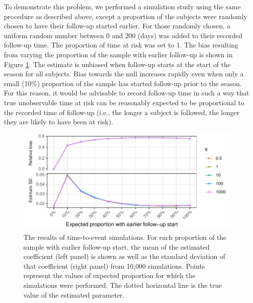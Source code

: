 
To demonstrate this problem, we performed a simulation study using the same procedure as described above, except a proportion of the subjects were randomly chosen to have their follow-up started earlier. For those randomly chosen, a uniform random number between 0 and 200 (days) was added to their recorded follow-up time. The proportion of time at risk was set to 1. The bias resulting from varying the proportion of the sample with earlier follow-up is shown in Figure \ref{CoxSimLong}. The estimate is unbiased when follow-up starts at the start of the season for all subjects. Bias towards the null increases rapidly even when only a small (10\%) proportion of the sample has started follow-up prior to the season. For this reason, it would be advisable to record follow-up time in such a way that true unobservable time at risk can be reasonably expected to be proportional to the recorded time of follow-up (i.e., the longer a subject is followed, the longer they are likely to have been at risk).

\begin{figure}[htp]
	\centering
	\includegraphics[width=1\textwidth]{../cox-tarprop-plot/long.pdf}
	\caption{
	The results of time-to-event simulations. For each proportion of the sample with earlier follow-up start, the mean of the estimated coefficient (left panel) is shown as well as the standard deviation of that coefficient (right panel) from 10,000 simulations. Points represent the values of expected proportion for which the simulations were performed. The dotted horizontal line is the true value of the estimated parameter.
	}
	\label{CoxSimLong}
\end{figure}
